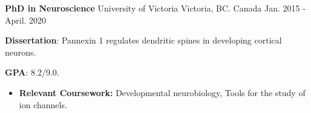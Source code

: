 

\begin{cventries}

\cventry
    {\textbf{PhD in Neuroscience}} %
    {University of Victoria} %
    {Victoria, BC. Canada} %
    {Jan. 2015 - April. 2020} %
    {
      \begin{cvitems} %
        \item \textbf{Dissertation}: Pannexin 1 regulates dendritic spines in developing cortical neurons.
        \item \textbf{GPA}: 8.2/9.0.
          \begin{itemize}
          \item \textbf{Relevant Coursework:} Developmental neurobiology, Tools for the study of ion channels.
          \end{itemize}   
      \end{cvitems}
    }
  

\end{cventries}
